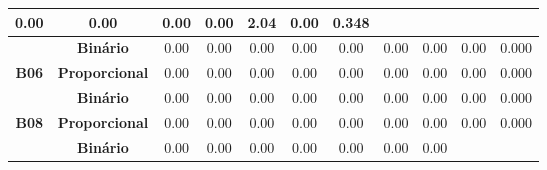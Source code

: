 \begin{table}[htbp]
\begin{tabular}{|c|cccccccccc|}
		\multicolumn{1}{c|}{\cellcolor[HTML]{F2F2F2}0.00} &
		\multicolumn{1}{c|}{\cellcolor[HTML]{F2F2F2}0.00} &
		\multicolumn{1}{c|}{\cellcolor[HTML]{F2F2F2}0.00} &
		\multicolumn{1}{c|}{\cellcolor[HTML]{F2F2F2}0.00} &
		\multicolumn{1}{c|}{\cellcolor[HTML]{F2F2F2}2.04} &
		\multicolumn{1}{c|}{\cellcolor[HTML]{F2F2F2}0.00} &
		\cellcolor[HTML]{F2F2F2}0.348 \\ \hline
		&
		\multicolumn{1}{c|}{\textbf{Binário}} &
		\multicolumn{1}{c|}{0.00} &
		\multicolumn{1}{c|}{0.00} &
		\multicolumn{1}{c|}{0.00} &
		\multicolumn{1}{c|}{0.00} &
		\multicolumn{1}{c|}{0.00} &
		\multicolumn{1}{c|}{0.00} &
		\multicolumn{1}{c|}{0.00} &
		\multicolumn{1}{c|}{0.00} &
		0.000 \\ \cline{2-11} 
		\multirow{-2}{*}{\textbf{B06}} &
		\multicolumn{1}{c|}{\cellcolor[HTML]{F2F2F2}\textbf{Proporcional}} &
		\multicolumn{1}{c|}{\cellcolor[HTML]{F2F2F2}0.00} &
		\multicolumn{1}{c|}{\cellcolor[HTML]{F2F2F2}0.00} &
		\multicolumn{1}{c|}{\cellcolor[HTML]{F2F2F2}0.00} &
		\multicolumn{1}{c|}{\cellcolor[HTML]{F2F2F2}0.00} &
		\multicolumn{1}{c|}{\cellcolor[HTML]{F2F2F2}0.00} &
		\multicolumn{1}{c|}{\cellcolor[HTML]{F2F2F2}0.00} &
		\multicolumn{1}{c|}{\cellcolor[HTML]{F2F2F2}0.00} &
		\multicolumn{1}{c|}{\cellcolor[HTML]{F2F2F2}0.00} &
		\cellcolor[HTML]{F2F2F2}0.000 \\ \hline
		&
		\multicolumn{1}{c|}{\textbf{Binário}} &
		\multicolumn{1}{c|}{0.00} &
		\multicolumn{1}{c|}{0.00} &
		\multicolumn{1}{c|}{0.00} &
		\multicolumn{1}{c|}{0.00} &
		\multicolumn{1}{c|}{0.00} &
		\multicolumn{1}{c|}{0.00} &
		\multicolumn{1}{c|}{0.00} &
		\multicolumn{1}{c|}{0.00} &
		0.000 \\ \cline{2-11} 
		\multirow{-2}{*}{\textbf{B08}} &
		\multicolumn{1}{c|}{\cellcolor[HTML]{F2F2F2}\textbf{Proporcional}} &
		\multicolumn{1}{c|}{\cellcolor[HTML]{F2F2F2}0.00} &
		\multicolumn{1}{c|}{\cellcolor[HTML]{F2F2F2}0.00} &
		\multicolumn{1}{c|}{\cellcolor[HTML]{F2F2F2}0.00} &
		\multicolumn{1}{c|}{\cellcolor[HTML]{F2F2F2}0.00} &
		\multicolumn{1}{c|}{\cellcolor[HTML]{F2F2F2}0.00} &
		\multicolumn{1}{c|}{\cellcolor[HTML]{F2F2F2}0.00} &
		\multicolumn{1}{c|}{\cellcolor[HTML]{F2F2F2}0.00} &
		\multicolumn{1}{c|}{\cellcolor[HTML]{F2F2F2}0.00} &
		\cellcolor[HTML]{F2F2F2}0.000 \\ \hline
		&
		\multicolumn{1}{c|}{\textbf{Binário}} &
		\multicolumn{1}{c|}{0.00} &
		\multicolumn{1}{c|}{0.00} &
		\multicolumn{1}{c|}{0.00} &
		\multicolumn{1}{c|}{0.00} &
		\multicolumn{1}{c|}{0.00} &
		\multicolumn{1}{c|}{0.00} &
		\multicolumn{1}{c|}{0.00} &

\end{tabular}
\end{table}
